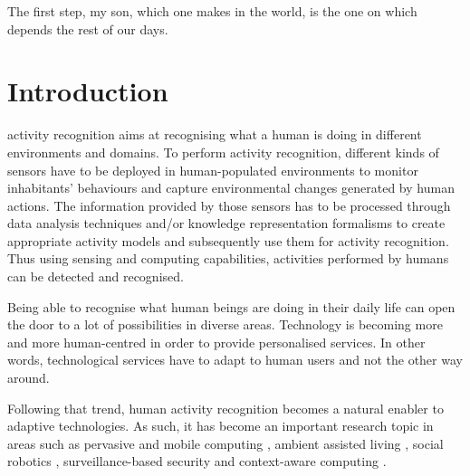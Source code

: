 



\begin{savequote}[50mm]
The first step, my son, which one makes in the world, is the one on which depends the rest of our days.
\end{savequote}

\chapter{Introduction}
\label{cha:introduction}

\ifpdf
    \graphicspath{{1_introduction/figures/PDF/}{1_introduction/figures/PNG/}{1_introduction/figures/}}
\else
    \graphicspath{{1_introduction/figures/EPS/}{1_introduction/figures/}}
\fi


\sloppy {} activity recognition aims at recognising what a human is doing in different environments and domains. To perform activity recognition, different kinds of sensors have to be deployed in human-populated environments to monitor inhabitants' behaviours and capture environmental changes generated by human actions. The information provided by those sensors has to be processed through data analysis techniques and/or knowledge representation formalisms to create appropriate activity models and subsequently use them for activity recognition. Thus using sensing and computing capabilities, activities performed by humans can be detected and recognised.

Being able to recognise what human beings are doing in their daily life can open the door to a lot of possibilities in diverse areas. Technology is becoming more and more human-centred in order to provide personalised services. In other words, technological services have to adapt to human users and not the other way around.

Following that trend, human activity recognition becomes a natural enabler to adaptive technologies. As such, it has become an important research topic in areas such as pervasive and mobile computing \citep{Choudhury2008}, ambient assisted living \citep{Philipose2004}, social robotics \citep{Fong2003a}, surveillance-based security \citep{Fernandez-Caballero2012} and context-aware computing \citep{Laerhoven2001}. 

